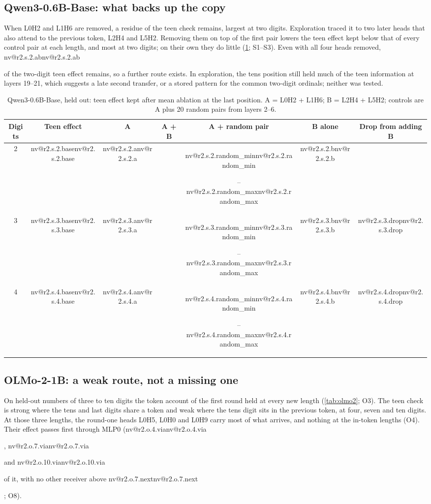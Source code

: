 \documentclass[11pt]{article}
\makeatletter
\newcommand{\nv}[1]{\ifcsname nv@#1\endcsname\csname nv@#1\endcsname\else\PackageError{numbers}{Unknown number key #1}{}\fi}
\newcommand{\qw}{Qwen3-0.6B-Base}
\newcommand{\ol}{OLMo-2-1B}
\newcommand{\mlp}[1]{MLP#1}
\newcommand{\hd}[2]{L#1H#2}
\makeatother
\begin{document}
\subsection{\qw{}: what backs up the copy}

When \hd{0}{2} and \hd{1}{6} are removed, a residue of the teen check remains, largest at two digits. Exploration traced it to two later heads that also attend to the previous token, \hd{2}{4} and \hd{5}{2}. Removing them on top of the first pair lowers the teen effect kept below that of every control pair at each length, and most at two digits; on their own they do little (\cref{tab:backup}; S1--S3). Even with all four heads removed, \nv{r2.s.2.ab} of the two-digit teen effect remains, so a further route exists. In exploration, the tens position still held much of the teen information at layers 19--21, which suggests a late second transfer, or a stored pattern for the common two-digit ordinals; neither was tested.

\begin{table}[t]
\centering\small
\caption{\qw{}, held out: teen effect kept after mean ablation at the last position. A = \hd{0}{2} + \hd{1}{6}; B = \hd{2}{4} + \hd{5}{2}; controls are A plus 20 random pairs from layers 2--6.}
\label{tab:backup}
\begin{tabular}{@{}c c c c c c c@{}}
\toprule
Digits & Teen effect & A & A + B & A + random pair & B alone & Drop from adding B \\
\midrule
2 & \nv{r2.s.2.base} & \nv{r2.s.2.a} & \textbf{\nv{r2.s.2.ab}} & \nv{r2.s.2.random_min}--\nv{r2.s.2.random_max} & \nv{r2.s.2.b} & \textbf{\nv{r2.s.2.drop}} \\
3 & \nv{r2.s.3.base} & \nv{r2.s.3.a} & \textbf{\nv{r2.s.3.ab}} & \nv{r2.s.3.random_min}--\nv{r2.s.3.random_max} & \nv{r2.s.3.b} & \nv{r2.s.3.drop} \\
4 & \nv{r2.s.4.base} & \nv{r2.s.4.a} & \textbf{\nv{r2.s.4.ab}} & \nv{r2.s.4.random_min}--\nv{r2.s.4.random_max} & \nv{r2.s.4.b} & \nv{r2.s.4.drop} \\
\bottomrule
\end{tabular}
\end{table}

\subsection{\ol{}: a weak route, not a missing one}

On held-out numbers of three to ten digits the token account of the first round held at every new length (\cref{tab:olmo2}; O3). The teen check is strong where the tens and last digits share a token and weak where the tens digit sits in the previous token, at four, seven and ten digits. At those three lengths, the round-one heads \hd{0}{5}, \hd{0}{0} and \hd{0}{9} carry most of what arrives, and nothing at the in-token lengths (O4). Their effect passes first through \mlp{0} (\nv{r2.o.4.via}, \nv{r2.o.7.via} and \nv{r2.o.10.via} of it, with no other receiver above \nv{r2.o.7.next}; O8).
\end{document}
